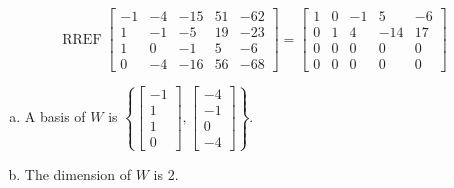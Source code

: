 \begin{exerciseAnswer} 


\[\operatorname{RREF} \left[\begin{array}{ccccc}
-1 & -4 & -15 & 51 & -62 \\
1 & -1 & -5 & 19 & -23 \\
1 & 0 & -1 & 5 & -6 \\
0 & -4 & -16 & 56 & -68
\end{array}\right] = \left[\begin{array}{ccccc}
1 & 0 & -1 & 5 & -6 \\
0 & 1 & 4 & -14 & 17 \\
0 & 0 & 0 & 0 & 0 \\
0 & 0 & 0 & 0 & 0
\end{array}\right] \]


\begin{enumerate}[(a)]
\item A basis of \(W\) is \( \left\{ \left[\begin{array}{c}
-1 \\
1 \\
1 \\
0
\end{array}\right] , \left[\begin{array}{c}
-4 \\
-1 \\
0 \\
-4
\end{array}\right] \right\} \).
\item The dimension of \(W\) is \( 2 \).
\end{enumerate}
    
\end{exerciseAnswer}
    
